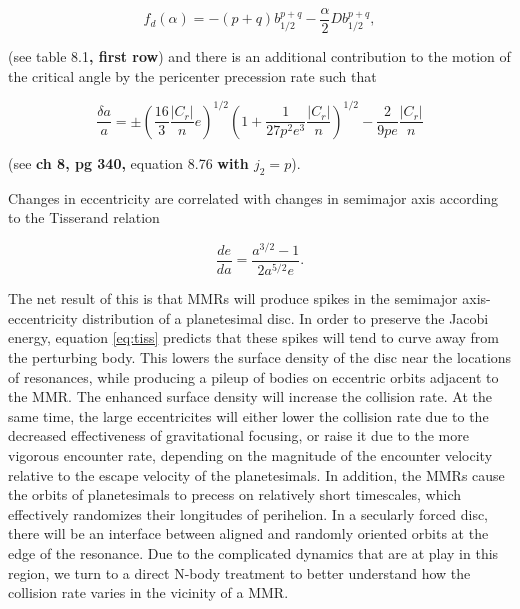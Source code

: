 \documentclass[fleqn,usenatbib]{mnras}
\begin{document}
\begin{equation}\label{eq:fd_fo}
	f_{d}(\alpha) = -(p+q) b_{1/2}^{p+q} - \frac{\alpha}{2} D b_{1/2}^{p+q},
\end{equation}

\noindent (see \citet{1999ssd..book.....M} table 8.1\textbf{, first row}) and there is an additional contribution to the motion of the critical angle by the pericenter precession rate such that

\begin{equation}\label{eq:res_fo}
	\frac{\delta a}{a} = \pm \left(\frac{16}{3} \frac{\left| C_{r} \right|}{n} e \right)^{1/2} \left(  1 + \frac{1}{27 p^2 e^3} \frac{\left| C_{r} \right|}{n} 
	\right)^{1/2} - \frac{2}{9 p e}  \frac{\left| C_{r} \right|}{n}
\end{equation}

\noindent (see \citet{1999ssd..book.....M} \textbf{ch 8, pg 340,} equation 8.76 \textbf{with $j_{2} = p$}).

Changes in eccentricity are correlated with changes in semimajor axis according to the Tisserand relation

\begin{equation}\label{eq:tiss}
	\frac{de}{da} = \frac{a^{3/2} - 1}{2 a^{5/2} e}.
\end{equation}

The net result of this is that MMRs will produce spikes in the semimajor axis-eccentricity distribution of a planetesimal disc. In order to 
preserve the Jacobi energy, equation \ref{eq:tiss} predicts that these spikes will tend to curve away from the perturbing body. This lowers the 
surface density of the disc near the locations of resonances, while producing a pileup of bodies on eccentric orbits adjacent to the MMR. The 
enhanced surface density will increase the collision rate. At the same time, the large eccentricites will either lower the collision rate due to the decreased 
effectiveness of gravitational focusing, or raise it due to the more vigorous encounter rate, depending on the magnitude of the encounter velocity relative to 
the escape velocity of the planetesimals. In addition, the MMRs cause the orbits of planetesimals to precess on relatively short 
timescales, which effectively randomizes their longitudes of perihelion. In a secularly forced disc, there will be an interface between aligned 
and randomly oriented orbits at the edge of the resonance. Due to the complicated dynamics that are at play in this region, we turn to a direct 
N-body treatment to better understand how the collision rate varies in the vicinity of a MMR.
\end{document}
